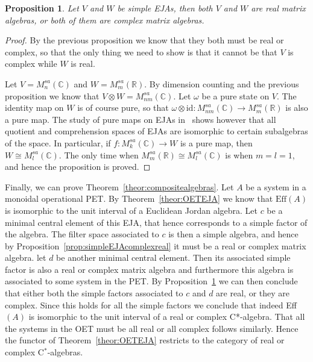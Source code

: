 \documentclass[a4paper,onecolumn,10pt,accepted=2019-05-03, issue=1, volume=1, shorttitle=papers/compositionality-1-1]{compositionalityarticle}
\newcounter{counter}
\numberwithin{counter}{section}
\newtheorem{proposition}[counter]{Proposition}
\newcommand{\R}{\mathbb{R}}
\newcommand{\C}{\mathbb{C}}
\newcommand{\pred}{\text{Eff}}
\newcommand{\id}{\text{id}}
\begin{document}
\begin{proposition}\label{prop:complexrealexclusion}
    Let $V$ and $W$ be simple EJAs, then both $V$ and $W$ are real matrix algebras, or both of them are complex matrix algebras.
\end{proposition}
\begin{proof}
    By the previous proposition we know that they both must be real or complex, so that the only thing we need to show is that it cannot be that $V$ is complex while $W$ is real.

    Let $V=M_n^{sa}(\C)$ and $W=M_m^{sa}(\R)$. By dimension counting and the previous proposition we know that $V\otimes W = M_{nm}^{sa}(\C)$. Let $\omega$ be a pure state on $V$. The identity map on $W$ is of course pure, so that $\omega\otimes \id: M_{nm}^{sa}(\C) \rightarrow M_m^{sa}(\R)$ is also a pure map. The study of pure maps on EJAs in~\cite{westerbaan2018puremaps} shows however that all quotient and comprehension spaces of EJAs are isomorphic to certain subalgebras of the space. In particular, if $f: M_k^{sa}(\C)\rightarrow W$ is a pure map, then $W\cong M_l^{sa}(\C)$. The only time when $M_m^{sa}(\R) \cong M_l^{sa}(\C)$ is when $m=l=1$, and hence the proposition is proved.
\end{proof}

Finally, we can prove Theorem~\ref{theor:compositealgebras}.
Let $A$ be a system in a monoidal operational PET. By Theorem~\ref{theor:OETEJA} we know that $\pred(A)$ is isomorphic to the unit interval of a Euclidean Jordan algebra. Let $c$ be a minimal central element of this EJA, that hence corresponds to a simple factor of the algebra. The filter space associated to $c$ is then a simple algebra, and hence by Proposition~\ref{prop:simpleEJAcomplexreal} it must be a real or complex matrix algebra. let $d$ be another minimal central element. Then its associated simple factor is also a real or complex matrix algebra and furthermore this algebra is associated to some system in the PET. By Proposition~\ref{prop:complexrealexclusion} we can then conclude that either both the simple factors associated to $c$ and $d$ are real, or they are complex. Since this holds for all the simple factors we conclude that indeed Eff$(A)$ is isomorphic to the unit interval of a real or complex C*-algebra. That all the systems in the OET must be all real or all complex follows similarly.
Hence the functor of Theorem~\ref{theor:OETEJA} restricts to the category of real or complex C$^*$-algebras.
\end{document}
